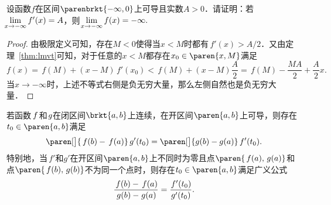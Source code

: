 \begin{example*}
  设函数\(f\)在区间\(\parenbrkt{-\infty,0}\)上可导且实数\(A > 0\)．请证明：若\(\negthickspace\lim\limits_{x\to-\infty} f'(x) = A\)，则
  \begin{math}
    \negthickspace\lim\limits_{x\to-\infty} f(x) = -\infty.
  \end{math}

  \begin{proof}
    由极限定义可知，存在\(M < 0\)使得当\(x < M\)时都有\(\,f'(x) > A/2\)．又由定理~\ref{thm:lmvt}可知，对于任意的\(x < M\)都存在\(x_0 \in \paren{x, M}\)满足
    \begin{equation*}
      f(x) = \,f(M) + (x - M)\,f'(x_0) < \,f(M) + (x - M) \frac A2 = \,f(M) - \frac{MA}{2} + \frac A2 x.
    \end{equation*}
    当\(x \to -\infty\)时，上述不等式右侧是负无穷大量，那么左侧自然也是负无穷大量．
  \end{proof}
\end{example*}

\begin{theorem}[柯西中值定理]
  \label{thm:cmvt}
  若函数\(\,f\mkern2mu\)和\(\mkern1mu g\)在闭区间\(\brkt{a,b}\)上连续，在开区间\(\paren{a,b}\)上可导，则存在\(t_0 \in \paren{a,b}\)满足
  \begin{equation*}
    \paren[\big]{\,f(b)-\,f(a)}\,g'(t_0) = \paren[\big]{g(b)-g(a)}\,f'(t_0).
  \end{equation*}
  特别地，当\(\,f'\!\)和\(g'\!\)在开区间\(\paren{a,b}\)上不同时为零且点\(\paren{\,f(a), \,g(a)}\)和点\(\paren{\,f(b), \,g(b)}\)不为同一个点时，则存在\(t_0 \in \paren{a,b}\)满足广义公式
  \begin{equation*}
    \frac{\,f(b)-\,f(a)}{\mkern2mu g(b)-\mkern1mu g(a)} = \frac{\mkern1mu f'(t_0)}{g'(t_0)}.
  \end{equation*}
\end{theorem}

